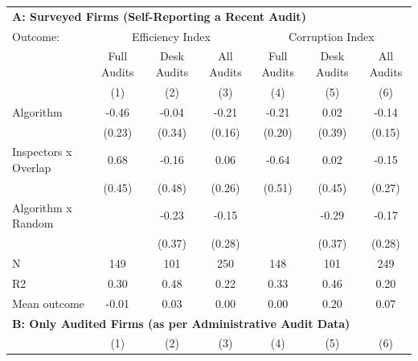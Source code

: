 \begin{tabular}{lccc|ccc} \toprule
\multicolumn{7}{l}{\textbf{A: Surveyed Firms (Self-Reporting a Recent Audit)}} \\ \multicolumn{1}{l}{Outcome:} & \multicolumn{3}{c}{Efficiency Index} & \multicolumn{3}{c}{Corruption Index} \\ \multicolumn{1}{l}{} & Full Audits & Desk Audits & All Audits & Full Audits & Desk Audits & All Audits \\ \multicolumn{1}{l}{} & (1) & (2) & (3) & (4) & (5) & (6) \\ \midrule
Algorithm   &       -0.46\sym{*}  &       -0.04         &       -0.21         &       -0.21         &        0.02         &       -0.14         \\
            &      (0.23)         &      (0.34)         &      (0.16)         &      (0.20)         &      (0.39)         &      (0.15)         \\
\addlinespace
Inspectors x Overlap&        0.68         &       -0.16         &        0.06         &       -0.64         &        0.02         &       -0.15         \\
            &      (0.45)         &      (0.48)         &      (0.26)         &      (0.51)         &      (0.45)         &      (0.27)         \\
\addlinespace
Algorithm x Random&                     &       -0.23         &       -0.15         &                     &       -0.29         &       -0.17         \\
            &                     &      (0.37)         &      (0.28)         &                     &      (0.37)         &      (0.28)         \\
\midrule
N           &         149         &         101         &         250         &         148         &         101         &         249         \\
R2          &        0.30         &        0.48         &        0.22         &        0.33         &        0.46         &        0.20         \\
Mean outcome&       -0.01         &        0.03         &        0.00         &        0.00         &        0.20         &        0.07         \\

\midrule \multicolumn{7}{l}{\textbf{B: Only Audited Firms (as per Administrative Audit Data)}} \\ \multicolumn{1}{l}{} & (1) & (2) & (3) & (4) & (5) & (6) \\ \midrule


\end{tabular}
